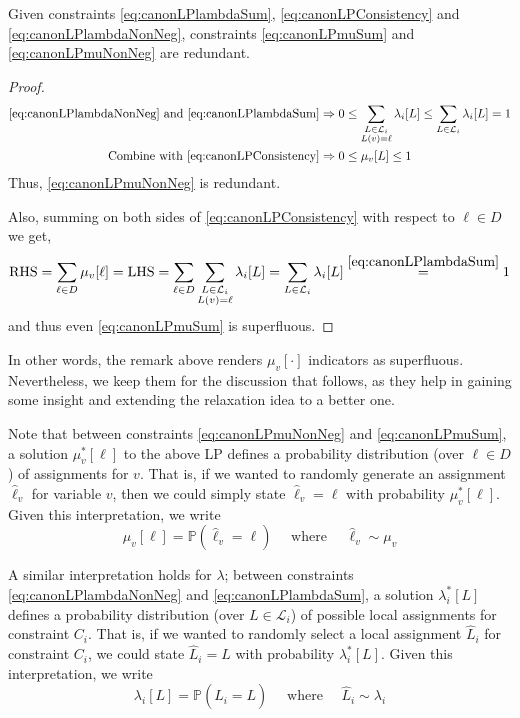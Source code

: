 \begin{remark}\label{re:super}
Given constraints \ref{eq:canonLPlambdaSum}, \ref{eq:canonLPConsistency} and \ref{eq:canonLPlambdaNonNeg}, constraints \ref{eq:canonLPmuSum} and \ref{eq:canonLPmuNonNeg} are redundant. 
\end{remark}
\begin{proof}
\begin{align*}
\ref{eq:canonLPlambdaNonNeg} \rm{\ and \ } \ref{eq:canonLPlambdaSum} &\Rightarrow 0\leq  \sum_{\substack{ L \in \mathcal{L}_i \\ L(v) = \ell }} \lambda_i[L] \leq  \sum_{L \in \mathcal{L}_i} \lambda_i[L] = 1  \\
{\rm \ Combine\ with \ }\ref{eq:canonLPConsistency}&\Rightarrow  0\leq \mu_v[L] \leq 1
\end{align*}
Thus, \ref{eq:canonLPmuNonNeg} is redundant. 

Also, summing on both sides of \ref{eq:canonLPConsistency} with respect to $\ell \in D$ we get, 
\begin{align*}
{\rm RHS} = \sum_{\ell \in D} \mu_v[\ell] = {\rm LHS} = \sum_{\ell \in D} \sum_{\substack{ L \in \mathcal{L}_i \\ L(v) = \ell }} \lambda_i[L] = \sum_{L \in \mathcal{L}_i} \lambda_i[L] \overset{\ref{eq:canonLPlambdaSum}}=1
\end{align*}
and thus even \ref{eq:canonLPmuSum} is superfluous.
\end{proof}

In other words, the remark above renders $\mu_v[\cdot]$ indicators as superfluous. Nevertheless, we keep them  for the discussion that follows, as they help in gaining some insight and extending the relaxation idea to a better one.

Note that between constraints \ref{eq:canonLPmuNonNeg} and \ref{eq:canonLPmuSum}, a solution $\mu^*_v[\ell]$ to the above LP defines a probability distribution (over $\ell \in D$) of assignments for $v$. That is, if we wanted to randomly generate an assignment $\hat{\ell}_v$ for variable $v$, then we could simply state $\hat{\ell}_v = \ell$ with probability $\mu^*_v[\ell]$. Given this interpretation, we write
\begin{equation}
\mu_v[\ell] = \mathbb{P}\left( \hat{\ell}_v = \ell \right) \quad \text{ where } \quad \hat{\ell}_v \sim \mu_v 
\end{equation}

A similar interpretation holds for $\lambda$; between constraints \ref{eq:canonLPlambdaNonNeg} and \ref{eq:canonLPlambdaSum}, a solution $\lambda^*_i[L]$ defines a probability distribution (over $L \in \mathcal{L}_i$) of possible local assignments for constraint $C_i$. That is, if we wanted to randomly select a local  assignment $\hat{L}_i$ for constraint $C_i$, we could state $\hat{L}_i = L$ with probability $\lambda^*_i[L]$. Given this interpretation, we write
\begin{equation}
\lambda_i[L] = \mathbb{P}\left( \hat{L}_i = L \right) \quad \text{ where } \quad \hat{L}_i \sim \lambda_i 
\end{equation}
  
